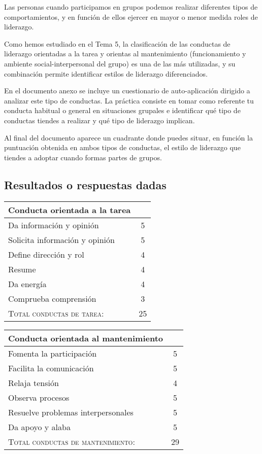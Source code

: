 \documentclass[palatino,nochap]{apuntesURJC}
\begin{document}
Las personas cuando participamos en grupos podemos realizar diferentes tipos de comportamientos, y en función de ellos ejercer en mayor o menor medida roles de liderazgo.

Como hemos estudiado en el Tema 5, la clasificación de las conductas de liderazgo orientadas a la tarea y orientas al mantenimiento (funcionamiento y ambiente social-interpersonal del grupo) es una de las más utilizadas, y su combinación permite identificar estilos de liderazgo diferenciados.

En el documento anexo se incluye un cuestionario de auto-aplicación dirigido a analizar este tipo de conductas. La práctica consiste en tomar como referente tu conducta habitual o general en situaciones grupales e identificar qué tipo de conductas tiendes a realizar y qué tipo de liderazgo implican.

Al final del documento aparece un cuadrante donde puedes situar, en función la puntuación obtenida en ambos tipos de conductas, el estilo de liderazgo que tiendes a adoptar cuando formas partes de grupos.


\subsection{Resultados o respuestas dadas}

\begin{table}[htbp]
\centering
\begin{tabular}{|l|c|}
\cline{1-1}
Conducta orientada a la tarea\\\hline\hline
Da información y opinión &5\\\hline
Solicita información y opinión &5\\\hline
Define dirección y rol &4\\\hline
Resume&4\\\hline
Da energía&4\\\hline
Comprueba comprensión&3\\\hline
\textsc{Total conductas de tarea:} & 25\\\hline
\end{tabular}
\end{table}

\begin{table}[htbp]
\centering
\begin{tabular}{|l|c|}
\cline{1-1}
Conducta orientada al mantenimiento\\\hline\hline
Fomenta la participación &5\\\hline
Facilita la comunicación&5\\\hline
Relaja tensión &4\\\hline
Observa procesos&5\\\hline
Resuelve problemas interpersonales&5\\\hline
Da apoyo y alaba&5\\\hline
\textsc{Total conductas de mantenimiento:}&29\\\hline
\end{tabular}
\end{table}
\end{document}
